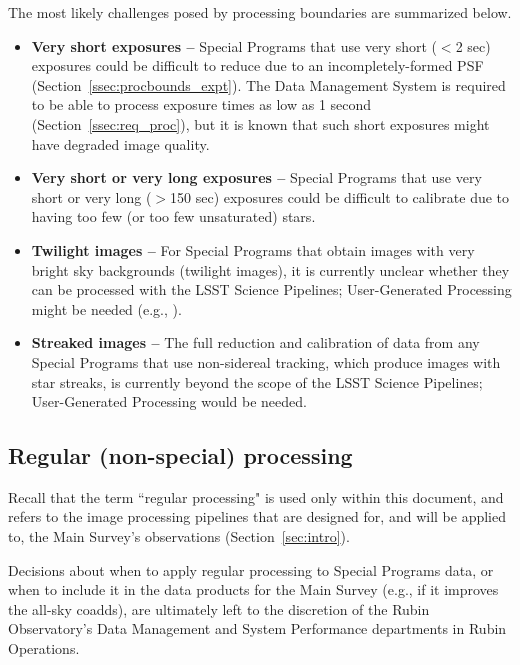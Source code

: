 The most likely challenges posed by processing
boundaries are summarized below.

\begin{itemize}

\item \textbf{Very short exposures --}
Special Programs that use very short ($<$2 sec) exposures 
could be difficult to reduce due to an incompletely-formed PSF 
(Section~\ref{ssec:procbounds_expt}).
The Data Management System is required to be able to process exposure 
times as low as 1 second (Section~\ref{ssec:req_proc}), 
but it is known that such short exposures might have degraded image quality.

\item \textbf{Very short or very long exposures --}
Special Programs that use very short or very long ($>$150 sec) 
exposures could be difficult to calibrate due to having too few 
(or too few unsaturated) stars.

\item \textbf{Twilight images --}
For Special Programs that obtain images with very bright sky backgrounds
(twilight images), it is currently unclear whether they can be processed
with the LSST Science Pipelines; 
User-Generated Processing might be needed (e.g., \citealt{2022AJ....164..168S}).

\item \textbf{Streaked images --}
The full reduction and calibration of data from any Special Programs that 
use non-sidereal tracking, which produce images with star streaks, is
currently beyond the scope of the LSST Science Pipelines; 
User-Generated Processing would be needed.

\end{itemize}

\subsection{Regular (non-special) processing}\label{ssec:proc_reg}

Recall that the term ``regular processing" is used only within this document,
and refers to the image processing pipelines that are designed for, 
and will be applied to, the Main Survey's observations (Section~\ref{sec:intro}).

Decisions about when to apply regular processing to Special Programs data,
or when to include it in the data products for the Main Survey
(e.g., if it improves the all-sky coadds), 
are ultimately left to the discretion of the Rubin Observatory's 
Data Management and System Performance departments in Rubin Operations.


